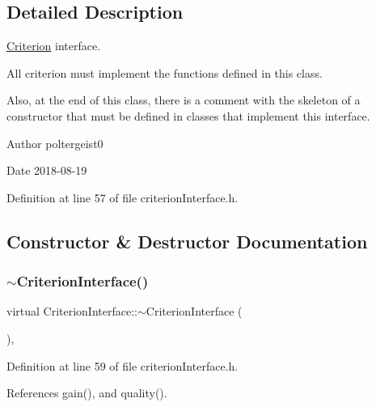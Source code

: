 \subsection{Detailed Description}
\hyperlink{classCriterion}{Criterion} interface. 

All criterion must implement the functions defined in this class.

Also, at the end of this class, there is a comment with the skeleton of a constructor that must be defined in classes that implement this interface.

\begin{DoxyAuthor}{Author}
poltergeist0
\end{DoxyAuthor}
\begin{DoxyDate}{Date}
2018-\/08-\/19 
\end{DoxyDate}


Definition at line 57 of file criterion\+Interface.\+h.



\subsection{Constructor \& Destructor Documentation}
\mbox{\label{classCriterionInterface_afe9cbd3c6f58b5c54828cbfdd6d9d48d}} 
\subsubsection{\texorpdfstring{$\sim$\+Criterion\+Interface()}{~CriterionInterface()}}
{\footnotesize\ttfamily virtual Criterion\+Interface\+::$\sim$\+Criterion\+Interface (\begin{DoxyParamCaption}{ }\end{DoxyParamCaption})\hspace{0.3cm}{\ttfamily [inline]}, {\ttfamily [virtual]}}



Definition at line 59 of file criterion\+Interface.\+h.



References gain(), and quality().


